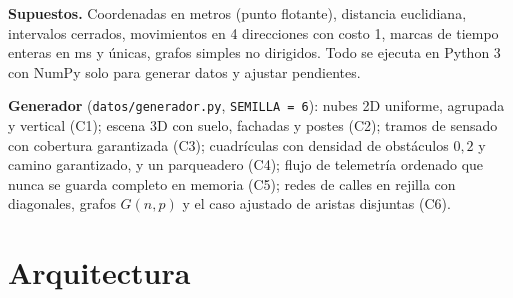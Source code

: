 \documentclass[11pt,letterpaper]{article}
\theoremstyle{plain}
\theoremstyle{definition}
\begin{document}
\textbf{Supuestos.} Coordenadas en metros (punto flotante), distancia euclidiana, intervalos cerrados,
movimientos en 4 direcciones con costo 1, marcas de tiempo enteras en ms y únicas, grafos simples no
dirigidos. Todo se ejecuta en Python 3 con NumPy solo para generar datos y ajustar pendientes.

\textbf{Generador} (\texttt{datos/generador.py}, \texttt{SEMILLA = 6}): nubes 2D uniforme, agrupada y
vertical (C1); escena 3D con suelo, fachadas y postes (C2); tramos de sensado con cobertura
garantizada (C3); cuadrículas con densidad de obstáculos $0{,}2$ y camino garantizado, y un
parqueadero (C4); flujo de telemetría ordenado que nunca se guarda completo en memoria (C5); redes de
calles en rejilla con diagonales, grafos $G(n,p)$ y el caso ajustado de aristas disjuntas (C6).

\section{Arquitectura}
\end{document}
